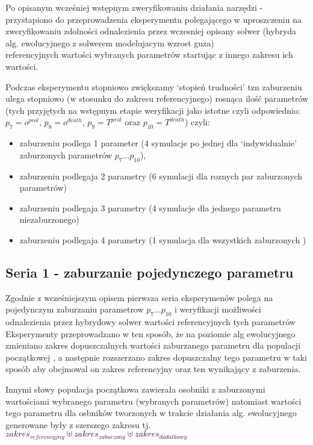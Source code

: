 \documentclass[]{article}
\providecommand{\tightlist}{%
  \setlength{\itemsep}{0pt}\setlength{\parskip}{0pt}}
\begin{document}
Po opisanym wcześniej wstępnym zweryfikowaniu działania narzędzi -
przystapiono do przeprowadzenia eksperymentu polegającego w uproszczeniu
na zweryfikowaniu zdolności odnalezienia przez wczesniej opisany solwer
(hybryda alg. ewolucyjnego z solwerem modelujacym wzrost guza)\\
referencyjnych wartości wybranych parametrów startując z innego zakresu
ich wartości.

Podczas eksperymentu stopniowo zwiększamy `stopień trudności' tzn
zaburzeniu ulega stopniowo (w stosunku do zakresu referencyjnego)
rosnąca ilość parametrów (tych przyjętych na wstępnym etapie weryfikacji
jako istotne czyli odpowiednio: \(p_7=o^{prol}\), \(p_8=o^{death}\),
\(p_9=T^{prol}\) oraz \(p_{10}=T^{death}\)) czyli:

\begin{itemize}
\tightlist
\item
  zaburzeniu podlega 1 parameter (4 symulacje po jednej dla
  `indywidualnie' zaburzonych parametrów \(p_7\ldots p_{10}\)),
\item
  zaburzeniu podlegaja 2 parametry (6 symulacji dla roznych par
  zaburzonych parametrów)
\item
  zaburzeniu podlegaja 3 parametry (4 symulacje dla jednego parametru
  niezaburzonego)
\item
  zaburzeniu podlegaja 4 parametry (1 symulacja dla wszystkich
  zaburzonych )
\end{itemize}

\subsection{Seria 1 - zaburzanie pojedynczego
parametru}\label{seria-1---zaburzanie-pojedynczego-parametru}

Zgodnie z wcześniejszym opisem pierwsza seria eksperymenów polega na
pojedynczym zaburzaniu parametrow \(p_7\ldots p_{10}\) i weryfikacji
możliwości odnalezienia przez hybrydowy solwer wartości referencyjnych
tych parametrów Eksperymenty przeprowadzano w ten sposób, że na poziomie
alg ewolucyjnego zmieniano zakres dopuszczalnych wartości zaburzanego
parametru dla populacji początkowej , a następnie rozszerzano zakres
dopuszczalny tego parametru w taki sposób aby obejmowal on zakres
referencyjny oraz ten wynikający z zaburzenia.

Innymi słowy populacja początkowa zawierała osobniki z zaburzonymi
wartościami wybranego parametru (wybranych parametrów) natomiast
wartości tego parametru dla osbników tworzonych w trakcie działania alg.
ewolucyjnego generowane były z szerszego zakresu tj.
\(zakres_{referencyjny} \uplus zakres_{zaburzony} \uplus zakres_{dodatkowy}\)
\end{document}
